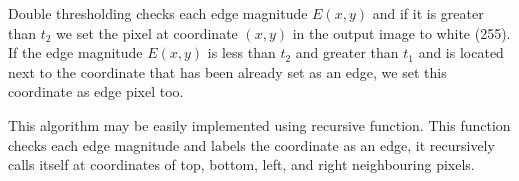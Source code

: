 \documentclass[12pt]{article}
\begin{document}
Double thresholding checks each edge magnitude $E(x, y)$ and if it is greater than $t_2$ we set the pixel at coordinate $(x, y)$
in the output image to white (255). If the edge magnitude $E(x, y)$ is less than $t_2$ and greater than $t_1$ and is
located next to the coordinate that has been already set as an edge, we set this coordinate as edge pixel too.

This algorithm may be easily implemented using recursive function. This function checks each edge magnitude and labels
the coordinate as an edge, it recursively calls itself at coordinates of top, bottom, left, and right neighbouring pixels.
\end{document}
